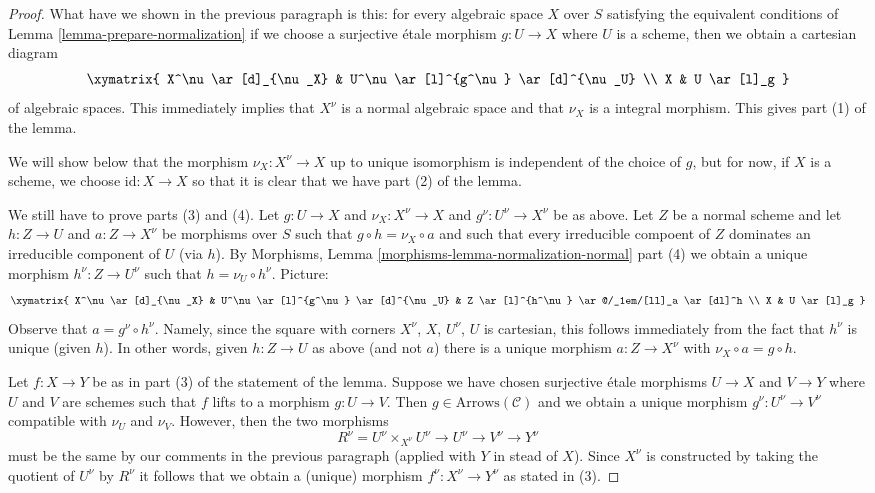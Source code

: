\begin{proof}
\medskip\noindent
What have we shown in the previous paragraph is this: for every algebraic
space $X$ over $S$ satisfying the equivalent conditions of
Lemma \ref{lemma-prepare-normalization} if we choose a surjective \'etale
morphism $g : U \to X$ where $U$ is a scheme, then we obtain
a cartesian diagram
$$
\xymatrix{
X^\nu \ar[d]_{\nu_X} & U^\nu \ar[l]^{g^\nu} \ar[d]^{\nu_U} \\
X & U \ar[l]_g
}
$$
of algebraic spaces. This immediately implies that $X^\nu$ is a normal
algebraic space and that $\nu_X$ is a integral morphism. This gives
part (1) of the lemma.

\medskip\noindent
We will show below that the morphism $\nu_X : X^\nu \to X$
up to unique isomorphism is independent of the choice of $g$,
but for now, if $X$ is a scheme, we choose $\text{id} : X \to X$
so that it is clear that we have part (2) of the lemma.

\medskip\noindent
We still have to prove parts (3) and (4). Let $g : U \to X$ and
$\nu_X : X^\nu \to X$ and $g^\nu : U^\nu \to X^\nu$ be as above.
Let $Z$ be a normal scheme and let $h : Z \to U$ and $a : Z \to X^\nu$
be morphisms over $S$ such that $g \circ h = \nu_X \circ a$ and such that
every irreducible compoent of $Z$ dominates an irreducible component of $U$
(via $h$). By
Morphisms, Lemma \ref{morphisms-lemma-normalization-normal} part (4)
we obtain a unique morphism $h^\nu : Z \to U^\nu$ such
that $h = \nu_U \circ h^\nu$. Picture:
$$
\xymatrix{
X^\nu \ar[d]_{\nu_X} &
U^\nu \ar[l]^{g^\nu} \ar[d]^{\nu_U} &
Z \ar[l]^{h^\nu} \ar@/_1em/[ll]_a \ar[dl]^h
\\
X & U \ar[l]_g
}
$$
Observe that $a = g^\nu \circ h^\nu$. Namely, since the square with
corners $X^\nu$, $X$, $U^\nu$, $U$ is cartesian, this follows
immediately from the fact that $h^\nu$ is unique (given $h$).
In other words, given $h : Z \to U$ as above (and not $a$)
there is a unique morphism $a : Z \to X^\nu$ with
$\nu_X \circ a = g \circ h$.

\medskip\noindent
Let $f : X \to Y$ be as in part (3) of the statement of the lemma.
Suppose we have chosen surjective \'etale morphisms $U \to X$ and
$V \to Y$ where $U$ and $V$ are schemes such that $f$ lifts to a
morphism $g : U \to V$. Then $g \in \text{Arrows}(\mathcal{C})$
and we obtain a unique morphism $g^\nu : U^\nu \to V^\nu$ compatible
with $\nu_U$ and $\nu_V$. However, then the two morphisms
$$
R^\nu = U^\nu \times_{X^\nu} U^\nu
\to U^\nu \to V^\nu \to Y^\nu
$$
must be the same by our comments in the previous paragraph (applied
with $Y$ in stead of $X$).
Since $X^\nu$ is constructed by taking the quotient of
$U^\nu$ by $R^\nu$ it follows that we obtain a (unique)
morphism $f^\nu : X^\nu \to Y^\nu$ as stated in (3).


\end{proof}
